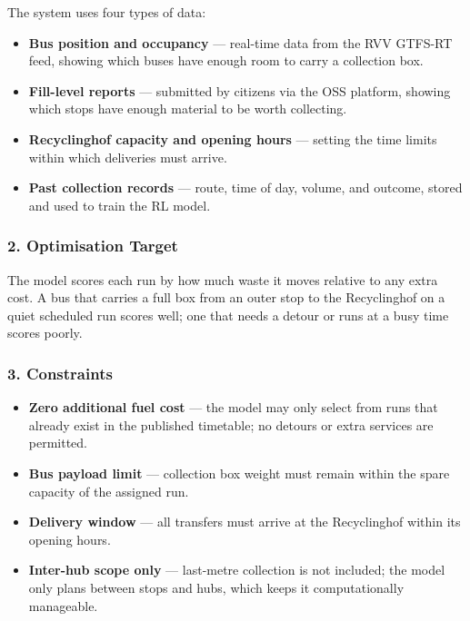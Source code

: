 \documentclass[12pt, a4paper]{article}
\begin{document}
The system uses four types of data:

\begin{itemize}
  \item \textbf{Bus position and occupancy} --- real-time data
  from the RVV GTFS-RT feed, showing which buses have enough
  room to carry a collection box.
  \item \textbf{Fill-level reports} --- submitted by citizens
  via the OSS platform, showing which stops have enough material
  to be worth collecting.
  \item \textbf{Recyclinghof capacity and opening hours} ---
  setting the time limits within which deliveries must arrive.
  \item \textbf{Past collection records} --- route, time of day,
  volume, and outcome, stored and used to train the RL model.
\end{itemize}

\subsubsection*{2. Optimisation Target}

The model scores each run by how much waste it moves relative to any extra cost.
A bus that carries a full box from an outer stop to the Recyclinghof on a quiet
scheduled run scores well; one that needs a detour or runs at a busy time scores poorly.

\subsubsection*{3. Constraints}

\begin{itemize}
  \item \textbf{Zero additional fuel cost} --- the model may
  only select from runs that already exist in the published
  timetable; no detours or extra services are permitted.
  \item \textbf{Bus payload limit} --- collection box weight
  must remain within the spare capacity of the assigned run.
  \item \textbf{Delivery window} --- all transfers must arrive
  at the Recyclinghof within its opening hours.
  \item \textbf{Inter-hub scope only} --- last-metre collection
  is not included; the model only plans between stops and hubs,
  which keeps it computationally manageable.
\end{itemize}
\end{document}

